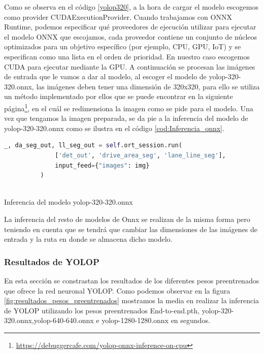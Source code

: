         Como se observa en el código \ref{yolop320}, a la hora de cargar el modelo escogemos como provider CUDAExecutionProvider. Cuando trabajamos con ONNX Runtime, 
        podemos especificar qué proveedores de ejecución utilizar para ejecutar el modelo ONNX que escojamos, cada proveedor contiene un conjunto de núcleos optimizados para un objetivo específico (por ejemplo, CPU, GPU, IoT) y 
        se especifican como una lista en el orden de prioridad. En nuestro caso escogemos CUDA para ejecutar mediante la GPU. 
        \newline
        A continuación se procesan las imágenes de entrada que le vamos a dar al modelo, al escoger el modelo de yolop-320-320.onnx, las imágenes deben tener una dimensión de 320x320, para ello
        se utiliza un método implementado por ellos que se puede encontrar en la siguiente página\footnote{\url{https://debuggercafe.com/yolop-onnx-inference-on-cpu}}, en el cuál se redimensiona la imagen como se pide para el modelo. 
        Una vez que tengamos la imagen preparada, se da pie a la inferencia del modelo de yolop-320-320.onnx como se ilustra en el código \ref{cod:Inferencia_onnx}. \newline
      
        \begin{code}[h]
          \begin{lstlisting}[language=Python]
            _, da_seg_out, ll_seg_out = self.ort_session.run(
              ['det_out', 'drive_area_seg', 'lane_line_seg'],
              input_feed={"images": img}
          )
        
          \end{lstlisting}
          \caption[Inferencia del modelo yolop-320-320.onnx]{Inferencia del modelo yolop-320-320.onnx}
          \label{cod:Inferencia_onnx}
          \end{code}  

        La inferencia del resto de modelos de Onnx se realizan de la misma forma pero teniendo en cuenta que se tendrá que cambiar las dimensiones de las imágenes de entrada y la ruta
        en donde se almacena dicho modelo. 


\subsubsection{Resultados de YOLOP }
\label{sec:resultados}
En esta sección se constrastan los resultados de los diferentes pesos preentrenados que ofrece la red neuronal YOLOP. Como podemos observar en la figura \ref{fig:resultados_pesos_preentrenados} 
mostramos la media en realizar la inferencia de YOLOP utilizando los pesos preentrenados End-to-end.pth, yolop-320-320.onnx,yolop-640-640.onnx e yolop-1280-1280.onnx en segundos.

